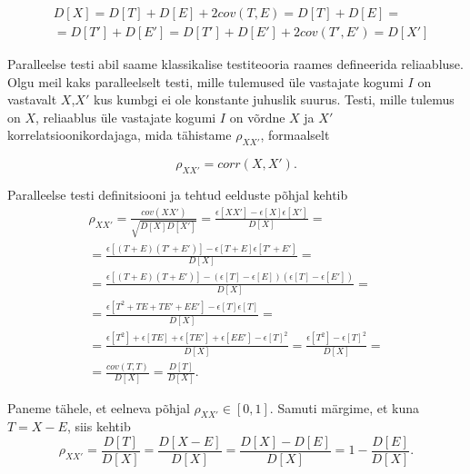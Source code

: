 \documentclass[a4paper,12pt]{article}
\numberwithin{equation}{section}
\theoremstyle{definition}
\begin{document}
\begin{align*}
&D[X] = D[T] + D[E] + 2cov(T,E) = D[T] + D[E] = \\
&= D[T'] + D[E'] = D[T'] + D[E'] + 2cov(T',E') = D[X']
\end{align*}

Paralleelse testi abil saame klassikalise testiteooria raames defineerida reliaabluse. Olgu meil kaks paralleelselt testi, mille tulemused \"ule vastajate kogumi $I$ on vastavalt $X$,$X'$ kus kumbgi ei ole konstante juhuslik suurus. Testi, mille tulemus on $X$,  reliaablus \"ule vastajate kogumi $I$ on võrdne $X$ ja $X'$ korrelatsioonikordajaga, mida tähistame $\rho_{XX'}$, formaalselt

\begin{equation*}
\rho_{XX'} = corr \left( X,X' \right) \text{.}
\end{equation*} 

Paralleelse testi definitsiooni ja tehtud eelduste põhjal kehtib \begin{gather*}
\rho_{XX'} = \frac{cov(XX')}{\sqrt{D \left[ X \right] D \left[ X' \right]}} =   
\frac{\epsilon \left[XX' \right] - \epsilon \left[X \right] \epsilon \left[ X' \right]}{D \left[ X \right]} = \\ 
= \frac{\epsilon \left[\left(T + E \right) \left( T' + E ' \right) \right] - \epsilon \left[T + E \right] \epsilon \left[ T'+E' \right]}{D \left[ X \right]} = \\
= \frac{\epsilon \left[\left(T + E \right) \left( T + E ' \right) \right] - \left( \epsilon \left[T \right] - \epsilon \left[ E \right] \right) \left( \epsilon \left[ T \right] - \epsilon \left[ E' \right] \right)}{D \left[ X \right]} = \\
= \frac{\epsilon \left[T^2 + TE + TE' + EE'  \right] -  \epsilon \left[T \right]  \epsilon \left[ T \right]}{D \left[ X \right]} = \\
= \frac{\epsilon \left[T^2 \right]  + \epsilon \left[ TE \right] + \epsilon \left[ TE' \right] + \epsilon \left[ EE'  \right] -  \epsilon \left[T \right]^2}{D \left[ X \right]} 
= \frac{\epsilon \left[T^2 \right] - \epsilon \left[ T \right]^2}{D \left [ X \right] } = \\ 
= \frac{cov(T,T)}{D \left[ X \right]} = \frac{D \left[T \right]}{D \left[ X \right]} \text{.}
\end{gather*}

Paneme tähele, et eelneva põhjal $\rho_{XX'} \in \left[0,1 \right]$. Samuti märgime, et kuna $T = X - E$, siis kehtib
\begin{equation}
\label{eq:reliability}
\rho_{XX'} = \frac{D \left[ T \right]}{D \left[ X \right] } = \frac{D \left[ X - E \right]}{D \left[ X \right] } = \frac{D \left[X \right] - D \left[ E \right]}{D \left[ X \right]} = 1 - \frac{D \left[ E \right]}{D \left[ X \right]} \text{.}
\end{equation}
\end{document}
